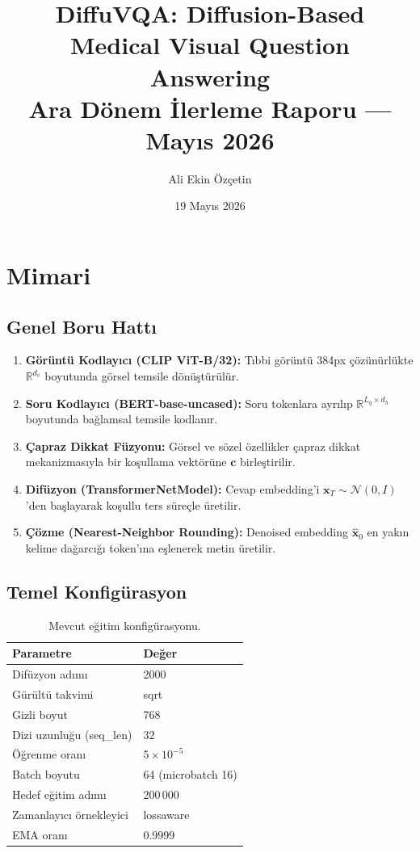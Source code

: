 \documentclass[12pt,a4paper]{article}
\title{\textbf{DiffuVQA: Diffusion-Based Medical Visual Question Answering}\\[0.4em]
\large{Ara Dönem İlerleme Raporu --- Mayıs 2026}}
\author{Ali Ekin Özçetin}
\date{19 Mayıs 2026}
\begin{document}
\maketitle

\section{Mimari}

\subsection{Genel Boru Hattı}

\begin{enumerate}
    \item \textbf{Görüntü Kodlayıcı (CLIP ViT-B/32):} Tıbbi görüntü 384px çözünürlükte $\mathbb{R}^{d_v}$ boyutunda görsel temsile dönüştürülür.
    \item \textbf{Soru Kodlayıcı (BERT-base-uncased):} Soru tokenlara ayrılıp $\mathbb{R}^{L_q \times d_h}$ boyutunda bağlamsal temsile kodlanır.
    \item \textbf{Çapraz Dikkat Füzyonu:} Görsel ve sözel özellikler çapraz dikkat mekanizmasıyla bir koşullama vektörüne $\mathbf{c}$ birleştirilir.
    \item \textbf{Difüzyon (TransformerNetModel):} Cevap embedding'i $\mathbf{x}_T \sim \mathcal{N}(0, I)$'den başlayarak koşullu ters süreçle üretilir.
    \item \textbf{Çözme (Nearest-Neighbor Rounding):} Denoised embedding $\hat{\mathbf{x}}_0$ en yakın kelime dağarcığı token'ına eşlenerek metin üretilir.
\end{enumerate}

\subsection{Temel Konfigürasyon}

\begin{table}[H]
\centering
\begin{tabular}{ll}
\toprule
\textbf{Parametre} & \textbf{Değer} \\
\midrule
Difüzyon adımı & 2000 \\
Gürültü takvimi & sqrt \\
Gizli boyut & 768 \\
Dizi uzunluğu (seq\_len) & 32 \\
Öğrenme oranı & $5 \times 10^{-5}$ \\
Batch boyutu & 64 (microbatch 16) \\
Hedef eğitim adımı & 200\,000 \\
Zamanlayıcı örnekleyici & lossaware \\
EMA oranı & 0.9999 \\
\bottomrule
\end{tabular}
\caption{Mevcut eğitim konfigürasyonu.}
\end{table}
\end{document}
